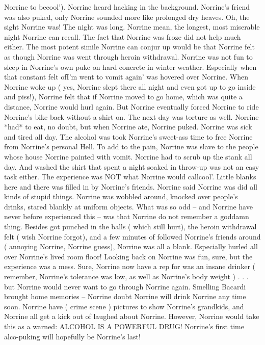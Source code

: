\documentclass[12pt]{book}
\begin{document}
Norrine to becool'). Norrine heard hacking in the background. Norrine's friend was also puked, only Norrine sounded more like prolonged dry heaves. Oh, the sight Norrine was! The night was long. Norrine mean, the longest, most miserable night Norrine can recall. The fact that Norrine was froze did not help much either. The most potent simile Norrine can conjur up would be that Norrine felt as though Norrine was went through heroin withdrawal. Norrine was not fun to sleep in Norrine's own puke on hard concrete in winter weather. Especially when that constant felt ofI'm went to vomit again' was hovered over Norrine. When Norrine woke up ( yes, Norrine slept there all night and even got up to go inside and piss!), Norrine felt that if Norrine moved to go home, which was quite a distance, Norrine would hurl again. But Norrine eventually forced Norrine to ride Norrine's bike back without a shirt on. The next day was torture as well. Norrine *had* to eat, no doubt, but when Norrine ate, Norrine puked. Norrine was sick and tired all day. The alcohol was took Norrine's sweet-ass time to free Norrine from Norrine's personal Hell. To add to the pain, Norrine was slave to the people whose house Norrine painted with vomit. Norrine had to scrub up the stank all day. And washed the shirt that spent a night soaked in throw-up was not an easy task either. The experience was NOT what Norrine would callcool'. Little blanks here and there was filled in by Norrine's friends. Norrine said Norrine was did all kinds of stupid things. Norrine was wobbled around, knocked over people's drinks, stared blankly at uniform objects. What was so odd -- and Norrine have never before experienced this -- was that Norrine do not remember a goddamn thing. Besides got punched in the balls ( which still hurt), the heroin withdrawal felt ( wish Norrine forgot), and a few minutes of followed Norrine's friends around ( annoying Norrine, Norrine guess), Norrine was all a blank. Especially hurled all over Norrine's lived room floor! Looking back on Norrine was fun, sure, but the experience was a mess. Sure, Norrine now have a rep for was an insane drinker ( remember, Norrine's tolerance was low, as well as Norrine's body weight ) . . . but Norrine would never want to go through Norrine again. Smelling Bacardi brought home memories -- Norrine doubt Norrine will drink Norrine any time soon. Norrine have ( crime scene ) pictures to show Norrine's grandkids, and Norrine all get a kick out of laughed about Norrine. However, Norrine would take this as a warned: ALCOHOL IS A POWERFUL DRUG! Norrine's first time alco-puking will hopefully be Norrine's last!
\end{document}
